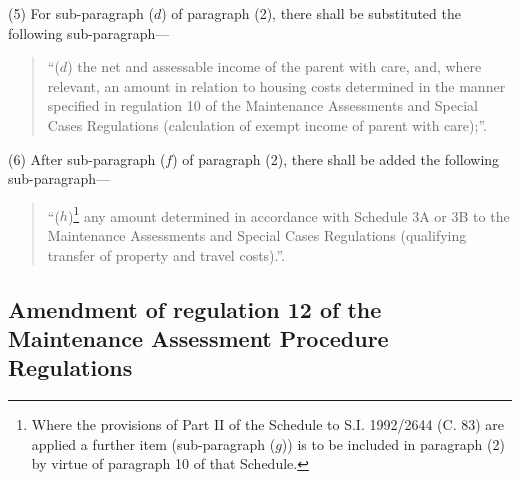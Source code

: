 \documentclass[a4paper]{article}
\begin{document}
(5) For sub-paragraph ($d$) of paragraph (2), there shall be substituted the following sub-paragraph—
\begin{quotation}
“($d$) the net and assessable income of the parent with care, and, where relevant, an amount in relation to housing costs determined in the manner specified in regulation 10 of the Maintenance Assessments and Special Cases Regulations (calculation of exempt income of parent with care);”.
\end{quotation}

(6) After sub-paragraph ($f$) of paragraph (2), there shall be added the following sub-paragraph—
\begin{quotation}
“($h$)\footnote{\frenchspacing Where the provisions of Part II of the Schedule to S.I. 1992/2644 (C. 83) are applied a further item (sub-paragraph ($g$)) is to be included in paragraph (2) by virtue of paragraph 10 of that Schedule.} any amount determined in accordance with Schedule 3A or 3B to the Maintenance Assessments and Special Cases Regulations (qualifying transfer of property and travel costs).”.
\end{quotation}

\subsection[19. Amendment of regulation 12 of the Maintenance Assessment Procedure Regulations]{Amendment of regulation 12 of the Maintenance Assessment Procedure Regulations}
\end{document}
